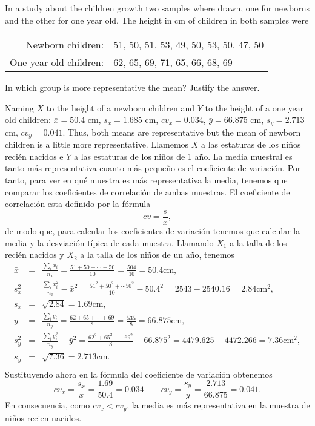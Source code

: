 {In a study about the children growth two samples where drawn, one for newborns and the other for one year old.
The height in cm of children in both samples were
\begin{center}
\begin{tabular}{rl}
Newborn children: & 51, 50, 51, 53, 49, 50, 53, 50, 47, 50\\
One year old children: & 62, 65, 69, 71, 65, 66, 68, 69
\end{tabular}
\end{center}

In which group is more representative the mean? Justify the answer.
}
{Naming $X$ to the height of a newborn children and $Y$ to the height of a one year old children:
$\bar x = 50.4$ cm, $s_x = 1.685$ cm, $cv_x=0.034$, $\bar y=66.875$ cm, $s_y=2.713$ cm, $cv_y=0.041$.
Thus, both means are representative but the mean of newborn children is a little more representative.
}
{Llamemos $X$ a las estaturas de los niños recién nacidos e $Y$ a las estaturas de los niños de 1 año.
La media muestral es tanto más representativa cuanto más pequeño es el coeficiente de variación.
Por tanto, para ver en qué muestra es más representativa la media, tenemos que comparar los coeficientes de correlación de ambas muestras.
El coeficiente de correlación esta definido por la fórmula
\[
cv=\frac{s}{\bar{x}},
\]
de modo que, para calcular los coeficientes de variación tenemos que calcular la media y la desviación típica de cada muestra.
Llamando $X_{1}$ a la talla de los recién nacidos y $X_{2}$ a la talla de los niños de un año, tenemos
\begin{eqnarray*}
\bar{x} & = & \frac{\sum_{i}^{}x_{i}}{n_{x}} =
\frac{51+50+\cdots +50}{10} = \frac{504}{10} =50.4 \mbox{cm}, \\
s_{x}^2 & = & \frac{\sum_{i}^{}x_{i}^2}{n_{x}}-\bar{x}^2 =
\frac{51^2+50^2+\cdots 50^2}{10}-50.4^2 = 2543-2540.16 = 2.84 \mbox{cm}^2,  \\
s_{x} & = & \sqrt{2.84} = 1.69 \mbox{cm},  \\
\bar{y} & = & \frac{\sum_{i}^{}y_{i}}{n_{y}} =
\frac{62+65+\cdots +69}{8} = \frac{535}{8} = 66.875 \mbox{cm},  \\
s_{y}^2 & = & \frac{\sum_{i}^{}y_{i}^2}{n_{y}}-\bar{y}^2 =
\frac{62^2+65^2+\cdots 69^2}{8}-66.875^2 = 4479.625-4472.266 = 7.36 \mbox{cm}^2,  \\
s_{y} & = & \sqrt{7.36} = 2.713 \mbox{cm}.  \\
\end{eqnarray*}
Sustituyendo ahora en la fórmula del coeficiente de variación obtenemos
\[
cv_{x}=\frac{s_{x}}{\bar{x}} = \frac{1.69}{50.4} = 0.034 \qquad
cv_{y}=\frac{s_{y}}{\bar{y}} = \frac{2.713}{66.875} = 0.041.
\]
En consecuencia, como $cv_{x}<cv_{y}$, la media es más representativa en la muestra de niños recien nacidos.
}


